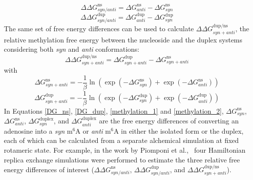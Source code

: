 \documentclass[journal=jacsat,manuscript=article]{achemso}
\begin{document}
\begin{equation}
    \Delta \Delta G^{\text{ns}}_{syn/anti}= \Delta G^{\text{ns}}_{anti}- \Delta G^{\text{ns}}_{syn} 
    \label{DG_ns}
\end{equation} 
\begin{equation}
    \Delta \Delta G^{\text{dup}}_{syn/anti}= \Delta G^{\text{dup}}_{anti}- \Delta G^{\text{dup}}_{syn} 
    \label{DG_dup}
\end{equation} 
The same set of free energy differences can be used to calculate $\Delta \Delta G^\text{dup/ns}_{syn+anti}$, the relative methylation free energy between the nucleoside and the duplex systems considering both \emph{syn} and \emph{anti} conformations: 
\begin{equation}
\Delta \Delta G^\text{dup/ns}_{syn + anti}=\Delta G^{\text{dup}}_{syn + anti} - \Delta G^{\text{ns}}_{syn + anti}
\label{DDG_3}
\end{equation}
with
\begin{equation}
\Delta G^{\text{ns}}_{syn + anti} = -\frac{1}{\beta}\ln(\exp(-\Delta G^{\text{ns}}_{syn}) + \exp(-\Delta G^{\text{ns}}_{anti}))
\label{methylation_1}
\end{equation}
\begin{equation}
\Delta G^{\text{dup}}_{syn+anti} = -\frac{1}{\beta}\ln(\exp(-\Delta G^{\text{dup}}_{syn}) + \exp(-\Delta G^{\text{dup}}_{anti}))
\label{methylation_2}
\end{equation}
In Equations \ref{DG_ns}, \ref{DG_dup}, \ref{methylation_1} and \ref{methylation_2}, $\Delta G^{\text{ns}}_{syn}$, $\Delta G^{\text{ns}}_{anti}$, $\Delta G^{\text{duplex}}_{syn}$, and $\Delta G^{\text{duplex}}_{anti}$ are the free energy differences of converting an adenosine into a \emph{syn} m$^6$A or \emph{anti} m$^6$A in either the isolated form or the duplex, each of which can be calculated from a separate alchemical simulation at fixed rotameric state. For example, in the work by Piomponi et al.,~\cite{piomponi2022molecular} four Hamiltonian replica exchange simulations were performed to estimate the three relative free energy differences of interest ($\Delta \Delta G^{\text{ns}}_{syn/anti}$, $\Delta \Delta G^{\text{dup}}_{syn/anti}$, and $\Delta \Delta G^\text{dup/ns}_{syn+anti}$).
\end{document}
